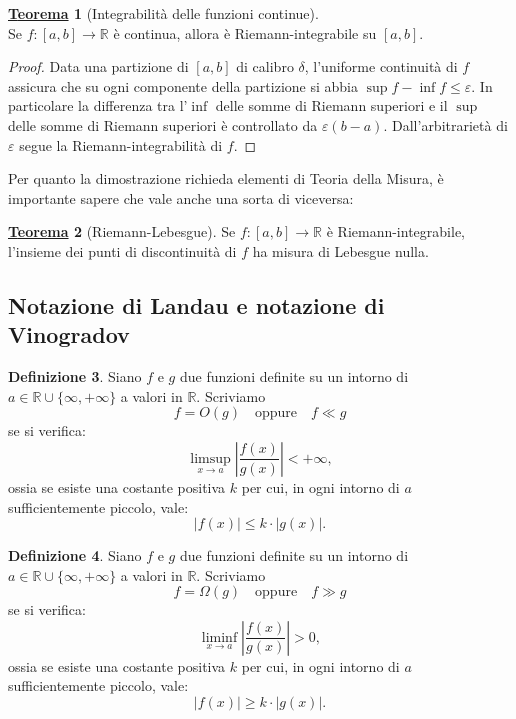 \documentclass[a4paper,twoside]{article}
\renewcommand{\epsilon}{\varepsilon}
\newcommand{\R}{\mathbb{R}}
\theoremstyle{definition}
\newtheorem{theorem}{\color{Red}\underline{\textrm Teorema}}
\newenvironment{theo}
  {\begin{shaded}\begin{theorem}}
  {\end{theorem}\end{shaded}}
\newtheorem{definizione}[theorem]{Definizione}
\numberwithin{theorem}{section}
\begin{document}
\begin{theo}[Integrabilità delle funzioni continue]$\phantom{}$
\\
Se $f:[a,b]\to\R$ è continua, allora è Riemann-integrabile su $[a,b]$.
\end{theo}
\begin{proof}
Data una partizione di $[a,b]$ di calibro $\delta$, l'uniforme continuità di $f$ assicura che su ogni componente della partizione si abbia $\sup f-\inf f \leq \epsilon$. In particolare la differenza tra l'$\inf$ delle somme di Riemann superiori e il $\sup$ delle somme di Riemann superiori è controllato da $\epsilon(b-a)$. Dall'arbitrarietà di $\epsilon$ segue la Riemann-integrabilità di $f$. 
\end{proof}

Per quanto la dimostrazione richieda elementi di Teoria della Misura, è importante sapere che vale anche una sorta di viceversa:

\begin{theorem}[Riemann-Lebesgue] Se $f:[a,b]\to\mathbb{R}$ è Riemann-integrabile, l'insieme dei punti di discontinuità di $f$ ha misura di Lebesgue nulla. 
\end{theorem}

\newpage

\subsection{Notazione di Landau e notazione di Vinogradov}
\begin{definizione}
Siano $f$ e $g$ due funzioni definite su un intorno di $a\in\R\cup\{\infty,+\infty\}$ a valori in $\R$. Scriviamo
$$ f = O(g)\quad\mbox{oppure}\quad f\ll g $$
se si verifica:
$$ \limsup_{x\to a}\left|\frac{f(x)}{g(x)}\right| < +\infty, $$
ossia se esiste una costante positiva $k$ per cui, in ogni intorno di $a$ sufficientemente piccolo, vale:
$$ |f(x)|\leq k\cdot |g(x)|. $$
\end{definizione}

\begin{definizione}
Siano $f$ e $g$ due funzioni definite su un intorno di $a\in\R\cup\{\infty,+\infty\}$ a valori in $\R$. Scriviamo
$$ f = \Omega(g)\quad\mbox{oppure}\quad f\gg g $$
se si verifica:
$$ \liminf_{x\to a}\left|\frac{f(x)}{g(x)}\right| > 0, $$
ossia se esiste una costante positiva $k$ per cui, in ogni intorno di $a$ sufficientemente piccolo, vale:
$$ |f(x)|\geq k\cdot |g(x)|.$$
\end{definizione}
\end{document}

